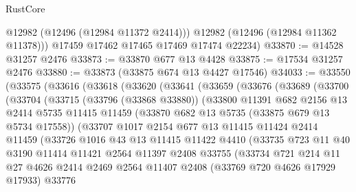 \begin{lexlean}{RustCore}
\begin{coremodule}
          @12982
          (@12496 (@12984 @11372 @2414)))
        @12982
        (@12496 (@12984 @11362 @11378)))
      @17459
      @17462
      @17465
      @17469
      @17474
      @22234)
@33870 := @14528 @31257 @2476
@33873 := @33870 @677 @13 @4428
@33875 := @17534 @31257 @2476
@33880 := @33873 (@33875 @674 @13 @4427 @17546)
@34033 := @33550
    (@33575
      (@33616
        (@33618
          (@33620
            (@33641
              (@33659
                (@33676
                  (@33689
                    (@33700
                      (@33704
                        (@33715
                          (@33796 (@33868 @33880))
                          (@33800
                            @11391
                            @682
                            @2156
                            @13
                            @2414
                            @5735
                            @11415
                            @11459
                            (@33870 @682 @13 @5735 (@33875 @679 @13 @5734 @17558))
                            (@33707
                              @1017
                              @2154
                              @677
                              @13
                              @11415
                              @11424
                              @2414
                              @11459
                              (@33726
                                @1016
                                @43
                                @13
                                @11415
                                @11422
                                @4410
                                (@33735
                                  @723
                                  @11
                                  @40
                                  @3190
                                  @11414
                                  @11421
                                  @2564
                                  @11397
                                  @2408
                                  @33755
                                  (@33734
                                    @721
                                    @214
                                    @11
                                    @27
                                    @4626
                                    @2414
                                    @2469
                                    @2564
                                    @11407
                                    @2408
                                    (@33769 @720 @4626 @17929 @17933)
                                    @33776

\end{coremodule}
\end{lexlean}
